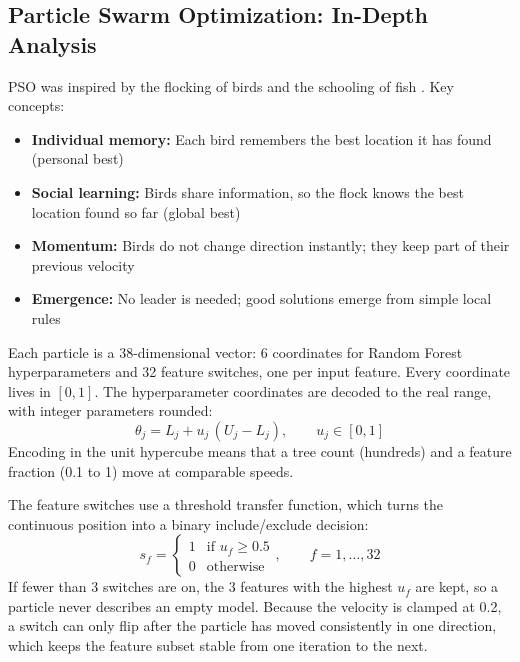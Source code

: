 \subsection{Particle Swarm Optimization: In-Depth Analysis}

PSO was inspired by the flocking of birds and the schooling of fish \cite{kennedy1995}. Key concepts:
\begin{itemize}
\item \textbf{Individual memory:} Each bird remembers the best location it has found (personal best)
\item \textbf{Social learning:} Birds share information, so the flock knows the best location found so far (global best)
\item \textbf{Momentum:} Birds do not change direction instantly; they keep part of their previous velocity
\item \textbf{Emergence:} No leader is needed; good solutions emerge from simple local rules
\end{itemize}

Each particle is a 38-dimensional vector: 6 coordinates for Random Forest hyperparameters and 32 feature switches, one per input feature. Every coordinate lives in $[0,1]$. The hyperparameter coordinates are decoded to the real range, with integer parameters rounded:
\begin{equation}
\theta_j = L_j + u_j\,(U_j - L_j), \qquad u_j \in [0,1]
\end{equation}
Encoding in the unit hypercube means that a tree count (hundreds) and a feature fraction (0.1 to 1) move at comparable speeds.

The feature switches use a threshold transfer function, which turns the continuous position into a binary include/exclude decision:
\begin{equation}
s_f = \begin{cases} 1 & \text{if } u_f \ge 0.5 \\ 0 & \text{otherwise} \end{cases}, \qquad f = 1, \dots, 32
\end{equation}
If fewer than 3 switches are on, the 3 features with the highest $u_f$ are kept, so a particle never describes an empty model. Because the velocity is clamped at 0.2, a switch can only flip after the particle has moved consistently in one direction, which keeps the feature subset stable from one iteration to the next.

